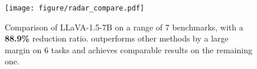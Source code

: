 \begin{figure}[!t]
    \centering
    \texttt{[image: figure/radar\_compare.pdf]}
    \caption{Comparison of LLaVA-1.5-7B on a range of 7 benchmarks, with a \textbf{88.9\%} reduction ratio. \algname outperforms other methods by a large margin on 6 tasks and achieves comparable results on the remaining one.}
    \label{fig:radar_compare}
\end{figure}